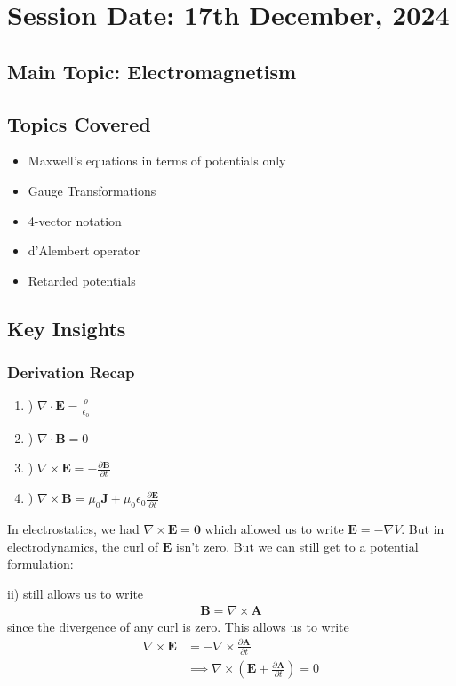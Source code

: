 \section{Session Date: 17th December, 2024}
\subsection*{Main Topic: Electromagnetism}
\subsection*{Topics Covered}
\begin{itemize}
    \item Maxwell's equations in terms of potentials only
    \item Gauge Transformations
    \item 4-vector notation
    \item d'Alembert operator
    \item Retarded potentials
\end{itemize}

\subsection*{Key Insights}
\subsubsection*{Derivation Recap}
\begin{enumerate}[label=\roman*]
    \item) $\nabla \cdot \mathbf{E} = \frac{\rho}{\epsilon_0}$
    \item) $\nabla \cdot \mathbf{B} = 0$
    \item) $\nabla \times \mathbf{E} = - \frac{\partial \mathbf{B}}{\partial t}$
    \item) $\nabla \times \mathbf{B} = \mu_0 \mathbf{J} + \mu_0 \epsilon _0 \frac{\partial \mathbf{E}}{\partial t}$
\end{enumerate}
In electrostatics, we had \(\nabla \times \mathbf{E} = \mathbf{0}\) which allowed us to write \(\mathbf{E} = - \nabla V\). But in electrodynamics, the curl of \(\mathbf{E}\) isn't zero. But we can still get to a potential formulation:  

ii) still allows us to write \begin{align*}
    \boxed{\mathbf{B} = \nabla \times \mathbf{A}}
\end{align*}since the divergence of any curl is zero. This allows us to write \begin{align*}
    \nabla \times \mathbf{E} &= - \nabla \times \frac{\partial \mathbf{A}}{\partial t} \\
    &\implies \nabla \times \left( \mathbf{E} + \frac{\partial \mathbf{A}}{\partial t}  \right) = 0
\end{align*}

